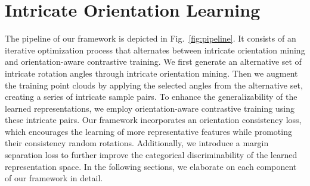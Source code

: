 

\section{Intricate Orientation Learning} \label{sec:method}



The pipeline of our framework is depicted in Fig.~\ref{fig:pipeline}. It consists of an iterative optimization process that alternates between intricate orientation mining and orientation-aware contrastive training. We first generate an alternative set of intricate rotation angles through intricate orientation mining. Then we augment the training point clouds by applying the selected angles from the alternative set, creating a series of intricate sample pairs. To enhance the generalizability of the learned representations, we employ orientation-aware contrastive training using these intricate pairs. Our framework incorporates an orientation consistency loss, which encourages the learning of more representative features while promoting their consistency \wrt random rotations. Additionally, we introduce a margin separation loss to further improve the categorical discriminability of the learned representation space.
In the following sections, we elaborate on each component of our framework in detail.




